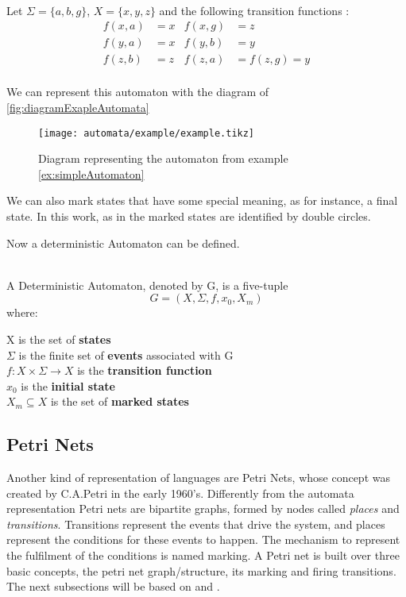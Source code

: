 \begin{example} ~\\
  \label{ex:simpleAutomaton}
  Let $\Sigma = \{a,b,g\}$, $X = \{x,y,z\}$ and the following transition
  functions \cite{cassandras2009introduction}:
  \begin{align*}
   f(x,a)&=x&f(x,g)&=z\\
   f(y,a)&=x&f(y,b)&=y\\
   f(z,b)&=z&f(z,a)&=f(z,g)=y\\
 \end{align*}
\end{example}
We can represent this automaton with the diagram of \autoref{fig:diagramExapleAutomata}
\begin{figure}[H]
  \centering
  \texttt{[image: automata/example/example.tikz]}
  \caption{Diagram representing the automaton from example \ref{ex:simpleAutomaton}}
  \label{fig:diagramExapleAutomata}
\end{figure}
We can also mark states that have some special meaning, as for instance, a final
state. In this work, as in \cite{cassandras2009introduction} the marked states are identified by double circles.

  
  Now a deterministic Automaton can be defined.
\begin{definition}
  \label{def:DeterministicAutomaton}~\\
  A Deterministic Automaton, denoted by G, is a five-tuple
  \[ G = (X,\Sigma,f, x_0,X_m)\] where:

  \indent X is the set of \textbf{states} \\
  \indent $\Sigma$ is the finite set of \textbf{events} associated with G\\
  \indent $f: X \times \Sigma \rightarrow X$ is the \textbf{transition function}  \\
  \indent $x_0$ is the \textbf{initial state} \\
  \indent $X_m \subseteq X $ is the set of \textbf{marked states}

\end{definition}

\subsection{Petri Nets}
\label{sec:petriNets}
Another kind of representation of languages are Petri Nets, whose concept was created by C.A.Petri
in the early 1960's. Differently from the automata representation Petri nets are bipartite graphs, formed by nodes
called \emph{places} and \emph{transitions}.
Transitions represent the events that drive the system, and places represent the
conditions for these events to happen. The mechanism to represent the fulfilment
of the conditions
is named marking. A Petri net is built over three basic concepts, the petri net
graph\slash structure, its marking and firing transitions.
The next subsections will be based on \cite{david2005discrete} and \cite{cassandras2009introduction}.

